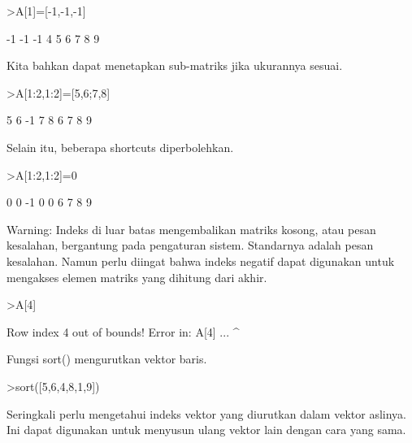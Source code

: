 \documentclass{article}
\begin{document}
\begin{eulernotebook}
\begin{eulercomment}
\begin{eulercomment}
\begin{eulercomment}
\begin{eulercomment}
\begin{eulercomment}
\begin{eulercomment}
\begin{eulercomment}
\end{eulercomment}
\begin{eulerprompt}
>A[1]=[-1,-1,-1]
\end{eulerprompt}
\begin{euleroutput}
             -1            -1            -1 
              4             5             6 
              7             8             9 
\end{euleroutput}
\begin{eulercomment}
Kita bahkan dapat menetapkan sub-matriks jika ukurannya sesuai.
\end{eulercomment}
\begin{eulerprompt}
>A[1:2,1:2]=[5,6;7,8]
\end{eulerprompt}
\begin{euleroutput}
              5             6            -1 
              7             8             6 
              7             8             9 
\end{euleroutput}
\begin{eulercomment}
Selain itu, beberapa shortcuts diperbolehkan.
\end{eulercomment}
\begin{eulerprompt}
>A[1:2,1:2]=0
\end{eulerprompt}
\begin{euleroutput}
              0             0            -1 
              0             0             6 
              7             8             9 
\end{euleroutput}
\begin{eulercomment}
Warning: Indeks di luar batas mengembalikan matriks kosong, atau pesan
kesalahan, bergantung pada pengaturan sistem. Standarnya adalah pesan
kesalahan. Namun perlu diingat bahwa indeks negatif dapat digunakan
untuk mengakses elemen matriks yang dihitung dari akhir.
\end{eulercomment}
\begin{eulerprompt}
>A[4]
\end{eulerprompt}
\begin{euleroutput}
  Row index 4 out of bounds!
  Error in:
  A[4] ...
      ^
\end{euleroutput}
\begin{eulercomment}
Fungsi sort() mengurutkan vektor baris.
\end{eulercomment}
\begin{eulerprompt}
>sort([5,6,4,8,1,9])
\end{eulerprompt}
\begin{euleroutput}
  [1,  4,  5,  6,  8,  9]
\end{euleroutput}
\begin{eulercomment}
Seringkali perlu mengetahui indeks vektor yang diurutkan dalam vektor
aslinya. Ini dapat digunakan untuk menyusun ulang vektor lain dengan
cara yang sama.


\end{eulercomment}
\end{eulercomment}
\end{eulercomment}
\end{eulercomment}
\end{eulercomment}
\end{eulercomment}
\end{eulercomment}
\end{eulernotebook}
\end{document}

